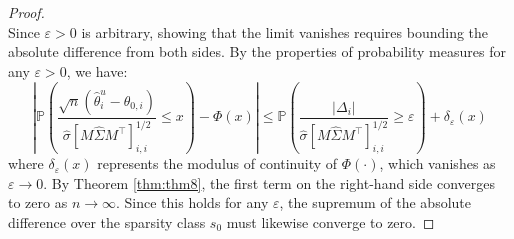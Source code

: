 \documentclass[10pt,a4paper]{amsart}
\begin{document}
\begin{proof}
$$    $$
Since $\varepsilon > 0$ is arbitrary, showing that the limit vanishes requires bounding the absolute difference from both sides. By the properties of probability measures for any $\varepsilon > 0$, we have:
\begin{equation}
    \left| \mathbb{P}\left( \frac{\sqrt{n}(\hat{\theta}^u_i - \theta_{0,i})}{\hat{\sigma} [M \hat{\Sigma}M^{\top}]_{i,i}^{1/2}} \le x \right) - \Phi(x) \right| \le \mathbb{P}\left( \frac{|\Delta_i|}{\hat{\sigma}[M \hat{\Sigma}M^\top]^{1/2}_{i,i}} \ge \varepsilon \right) + \delta_\varepsilon(x)
\end{equation}
where $\delta_\varepsilon(x)$ represents the modulus of continuity of $\Phi(\cdot)$, which vanishes as $\varepsilon \to 0$. By Theorem \ref{thm:thm8}, the first term on the right-hand side converges to zero as $n \to \infty$. Since this holds for any $\varepsilon$, the supremum of the absolute difference over the sparsity class $s_0$ must likewise converge to zero.
\end{proof}
\end{document}
